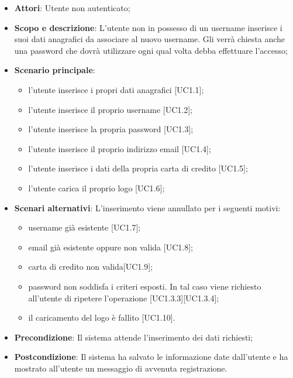 \documentclass[12pt,a4paper,titlepage]{article}
\begin{document}
	\begin{itemize}
		\item \textbf{Attori}: Utente non autenticato;
		\item \textbf{Scopo e descrizione}: L'utente non in possesso di un username inserisce i suoi dati anagrafici da associare al nuovo username. Gli verrà chiesta anche una password che dovrà utilizzare ogni qual volta debba effettuare l'accesso;
		\item \textbf{Scenario principale}: 
		\begin{itemize}
			\item l'utente inserisce i propri dati anagrafici [UC1.1];
			\item l'utente inserisce il proprio username [UC1.2];
			\item l'utente inserisce la propria password [UC1.3];
			\item l'utente inserisce il proprio indirizzo email [UC1.4];
			\item l'utente inserisce i dati della propria carta di credito [UC1.5];
			\item l'utente carica il proprio logo [UC1.6];
		\end{itemize}
		\item \textbf{Scenari alternativi}: L'inserimento viene annullato per i seguenti motivi:
		\begin{itemize}
			\item username già esistente [UC1.7];
			\item email già esistente oppure non valida [UC1.8];
			\item carta di credito non valida[UC1.9];
			\item password non soddisfa i criteri esposti. In tal caso viene richiesto all'utente di ripetere l'operazione [UC1.3.3][UC1.3.4];
			\item il caricamento del logo è fallito [UC1.10].
		\end{itemize}
		\item \textbf{Precondizione}: Il sistema attende l'inserimento dei dati richiesti;
		\item \textbf{Postcondizione}: Il sistema ha salvato le informazione date dall'utente e ha mostrato all'utente un messaggio di avvenuta registrazione.
	\end{itemize}
\end{document}
